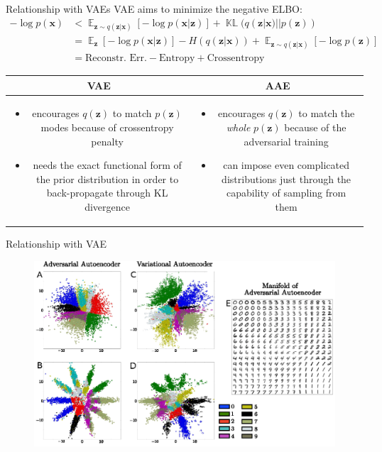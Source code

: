 \documentclass[10pt]{beamer}
\DeclareMathOperator{\E}{\mathbb E}
\DeclareMathOperator{\KL}{\mathbb{KL}}
\newcommand{\vect}[1]{\boldsymbol{#1}} %
\begin{document}
\begin{frame}{Relationship with VAEs}
VAE aims to minimize the negative ELBO:
\begin{align*}
  -\log p(\vect x)
    &< \E_{\vect z \sim q(\vect z | \vect x)}[-\log p(\vect x | \vect z)] + \KL(q(\vect z | \vect x) || p(\vect z)) \\
    &= \E_{\vect z}[-\log p(\vect x | \vect z)] - H(q(\vect z | \vect x)) + \E_{\vect z \sim q(\vect z | \vect x)}[-\log p(\vect z)] \\
    &= \text{Reconstr. Err.} - \text{Entropy} + \text{Crossentropy}
\end{align*}
\begin{table}
  \begin{tabular}{c c}
    \textbf{VAE} & \textbf{AAE} \\ \hline
  \parbox{0.5\linewidth}{\begin{itemize}
      \item encourages $ q(\vect z) $ to match $ p(\vect z) $ modes because of crossentropy penalty
      \item needs the exact functional form of the prior distribution in order to back-propagate through KL divergence
  \end{itemize}} &
  \parbox{0.45\linewidth}{\begin{itemize}
      \item encourages $ q(\vect z) $ to match the \textit{whole} $ p(\vect z) $ because of the adversarial training
      \item can impose even complicated distributions just through the capability of sampling from them
  \end{itemize}} \\
  \end{tabular}
\end{table}
\end{frame}

\begin{frame}{Relationship with VAE}
\begin{figure}
  \centering
  \includegraphics[width=0.8\linewidth]{../images/aae-embedding-01.png}
\end{figure}
\end{frame}
\end{document}
